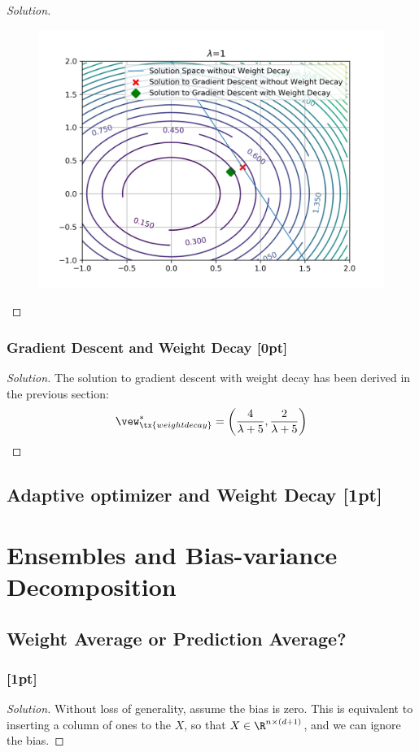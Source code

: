 \documentclass{article}
\begin{document}
\begin{proof}[Solution]
\begin{figure}[H]
			\includegraphics[width=\linewidth]{plot_q1.png}
		\end{figure}
	\end{proof}
	
	\subsubsection{Gradient Descent and Weight Decay [0pt]}
	\begin{proof}[Solution]
		The solution to gradient descent with weight decay has been derived in the previous section:
		\begin{align}
			\vew^*_\tx{weight decay} = \left(\frac{4}{\lambda +5}, \frac{2}{\lambda +5}\right)
		\end{align}
	\end{proof}
	
	\subsection{Adaptive optimizer and Weight Decay [1pt]}
	
	\section{Ensembles and Bias-variance Decomposition}
	\subsection{Weight Average or Prediction Average?}
	\subsubsection{[1pt]}
	\begin{proof}[Solution]
		Without loss of generality, assume the bias is zero. This is equivalent to inserting a column of ones to the $X$, so that $X \in \R^{n \times (d+1)}$, and we can ignore the bias.
	\end{proof}
	
\end{document}

